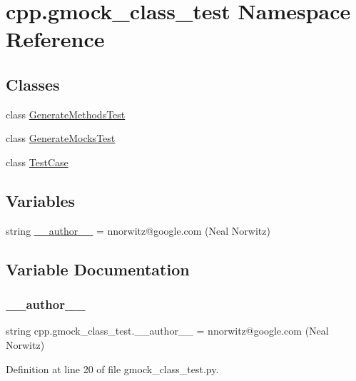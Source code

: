 \hypertarget{namespacecpp_1_1gmock__class__test}{}\section{cpp.\+gmock\+\_\+class\+\_\+test Namespace Reference}
\label{namespacecpp_1_1gmock__class__test}
\subsection*{Classes}
\begin{DoxyCompactItemize}
\item 
class \hyperlink{classcpp_1_1gmock__class__test_1_1GenerateMethodsTest}{Generate\+Methods\+Test}
\item 
class \hyperlink{classcpp_1_1gmock__class__test_1_1GenerateMocksTest}{Generate\+Mocks\+Test}
\item 
class \hyperlink{classcpp_1_1gmock__class__test_1_1TestCase}{Test\+Case}
\end{DoxyCompactItemize}
\subsection*{Variables}
\begin{DoxyCompactItemize}
\item 
string \hyperlink{namespacecpp_1_1gmock__class__test_a72474ac6fe2295f91f383e45b9b6e536}{\+\_\+\+\_\+author\+\_\+\+\_\+} = \textquotesingle{}nnorwitz@google.\+com (Neal Norwitz)\textquotesingle{}
\end{DoxyCompactItemize}


\subsection{Variable Documentation}
\mbox{\label{namespacecpp_1_1gmock__class__test_a72474ac6fe2295f91f383e45b9b6e536}} 
\subsubsection{\texorpdfstring{\+\_\+\+\_\+author\+\_\+\+\_\+}{\_\_author\_\_}}
{\footnotesize\ttfamily string cpp.\+gmock\+\_\+class\+\_\+test.\+\_\+\+\_\+author\+\_\+\+\_\+ = \textquotesingle{}nnorwitz@google.\+com (Neal Norwitz)\textquotesingle{}\hspace{0.3cm}{\ttfamily [private]}}



Definition at line 20 of file gmock\+\_\+class\+\_\+test.\+py.

